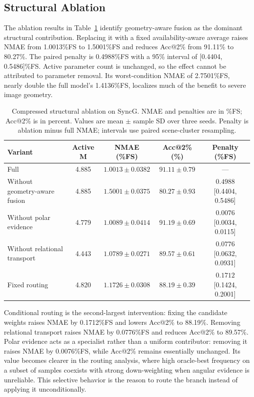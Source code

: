 \documentclass[electronics,article,submit,oneauthor]{Definitions/mdpi}
\begin{document}
\subsection{Structural Ablation}
\label{subsec:ablation_results}

The ablation results in Table~\ref{tab:ablation_results} identify geometry-aware fusion as the dominant structural contribution. Replacing it with a fixed availability-aware average raises NMAE from 1.0013\%FS to 1.5001\%FS and reduces Acc@2\% from 91.11\% to 80.27\%. The paired penalty is 0.4988\%FS with a 95\% interval of [0.4404, 0.5486]\%FS. Active parameter count is unchanged, so the effect cannot be attributed to parameter removal. Its worst-condition NMAE of 2.7501\%FS, nearly double the full model's 1.4136\%FS, localizes much of the benefit to severe image geometry.

\begin{table}[H]
\caption{Compressed structural ablation on SyncG. NMAE and penalties are in \%FS; Acc@2\% is in percent. Values are mean $\pm$ sample SD over three seeds. Penalty is ablation minus full NMAE; intervals use paired scene-cluster resampling.}
\label{tab:ablation_results}
\centering
\small
\begin{tabularx}{\textwidth}{@{}>{\raggedright\arraybackslash}Xcccc@{}}
\toprule
\textbf{Variant} & \textbf{Active M} & \textbf{NMAE (\%FS)} & \textbf{Acc@2\% (\%)} & \textbf{Penalty (\%FS)} \\
\midrule
Full & 4.885 & $1.0013\pm0.0382$ & $91.11\pm0.79$ & --- \\
Without geometry-aware fusion & 4.885 & $1.5001\pm0.0375$ & $80.27\pm0.93$ & $0.4988$ [0.4404, 0.5486] \\
Without polar evidence & 4.779 & $1.0089\pm0.0414$ & $91.19\pm0.69$ & $0.0076$ [0.0034, 0.0115] \\
Without relational transport & 4.443 & $1.0789\pm0.0271$ & $89.57\pm0.61$ & $0.0776$ [0.0632, 0.0931] \\
Fixed routing & 4.820 & $1.1726\pm0.0308$ & $88.19\pm0.39$ & $0.1712$ [0.1424, 0.2001] \\
\bottomrule
\end{tabularx}
\end{table}

Conditional routing is the second-largest intervention: fixing the candidate weights raises NMAE by 0.1712\%FS and lowers Acc@2\% to 88.19\%. Removing relational transport raises NMAE by 0.0776\%FS and reduces Acc@2\% to 89.57\%. Polar evidence acts as a specialist rather than a uniform contributor: removing it raises NMAE by 0.0076\%FS, while Acc@2\% remains essentially unchanged. Its value becomes clearer in the routing analysis, where high oracle-best frequency on a subset of samples coexists with strong down-weighting when angular evidence is unreliable. This selective behavior is the reason to route the branch instead of applying it unconditionally.
\end{document}
